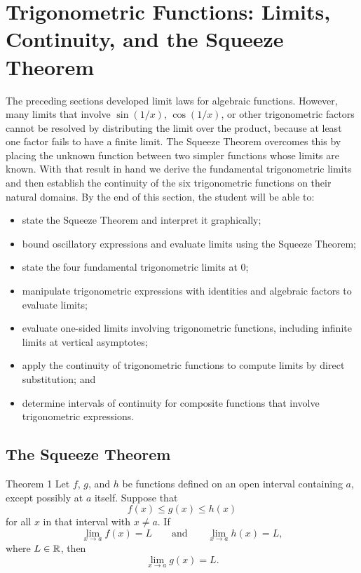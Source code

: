 \section{Trigonometric Functions: Limits, Continuity, and the Squeeze Theorem}
\label{sec:1.6}

The preceding sections developed limit laws for algebraic functions. However, many limits that involve \(\sin(1/x)\), \(\cos(1/x)\), or other trigonometric factors cannot be resolved by distributing the limit over the product, because at least one factor fails to have a finite limit. The Squeeze Theorem overcomes this by placing the unknown function between two simpler functions whose limits are known. With that result in hand we derive the fundamental trigonometric limits and then establish the continuity of the six trigonometric functions on their natural domains. By the end of this section, the student will be able to:
\begin{itemize}
    \item state the Squeeze Theorem and interpret it graphically;
    \item bound oscillatory expressions and evaluate limits using the Squeeze Theorem;
    \item state the four fundamental trigonometric limits at \(0\);
    \item manipulate trigonometric expressions with identities and algebraic factors to evaluate limits;
    \item evaluate one-sided limits involving trigonometric functions, including infinite limits at vertical asymptotes;
    \item apply the continuity of trigonometric functions to compute limits by direct substitution; and
    \item determine intervals of continuity for composite functions that involve trigonometric expressions.
\end{itemize}

\subsection*{The Squeeze Theorem}
\label{subsec:1.6.1}

\begin{theorembox}{Theorem 1}
Let \(f\), \(g\), and \(h\) be functions defined on an open interval containing \(a\), except possibly at \(a\) itself. Suppose that
\[
f(x) \leq g(x) \leq h(x)
\]
for all \(x\) in that interval with \(x \neq a\). If
\[
\lim_{x \to a} f(x) = L \qquad\text{and}\qquad \lim_{x \to a} h(x) = L,
\]
where \(L \in \mathbb{R}\), then
\[
\lim_{x \to a} g(x) = L.
\]
\end{theorembox}

